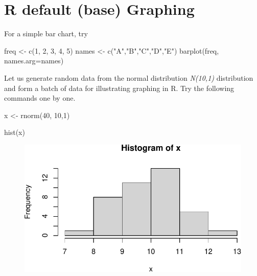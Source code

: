 \documentclass[
  letterpaper,
  DIV=11,
  numbers=noendperiod]{scrreprt}
\newenvironment{Shaded}{\begin{snugshade}}{\end{snugshade}}
\newcommand{\AttributeTok}[1]{\textcolor[rgb]{0.40,0.45,0.13}{#1}}
\newcommand{\DecValTok}[1]{\textcolor[rgb]{0.68,0.00,0.00}{#1}}
\newcommand{\FunctionTok}[1]{\textcolor[rgb]{0.28,0.35,0.67}{#1}}
\newcommand{\NormalTok}[1]{\textcolor[rgb]{0.00,0.23,0.31}{#1}}
\newcommand{\OtherTok}[1]{\textcolor[rgb]{0.00,0.23,0.31}{#1}}
\newcommand{\StringTok}[1]{\textcolor[rgb]{0.13,0.47,0.30}{#1}}
\begin{document}
\hypertarget{r-default-base-graphing}{%
\chapter*{R default (base) Graphing}\label{r-default-base-graphing}}

For a simple bar chart, try

\begin{Shaded}
\begin{Highlighting}[]
\NormalTok{freq }\OtherTok{\textless{}{-}} \FunctionTok{c}\NormalTok{(}\DecValTok{1}\NormalTok{, }\DecValTok{2}\NormalTok{, }\DecValTok{3}\NormalTok{, }\DecValTok{4}\NormalTok{, }\DecValTok{5}\NormalTok{)}
\NormalTok{names }\OtherTok{\textless{}{-}} \FunctionTok{c}\NormalTok{(}\StringTok{"A"}\NormalTok{,}\StringTok{"B"}\NormalTok{,}\StringTok{"C"}\NormalTok{,}\StringTok{"D"}\NormalTok{,}\StringTok{"E"}\NormalTok{)}
\FunctionTok{barplot}\NormalTok{(freq, }\AttributeTok{names.arg=}\NormalTok{names)}
\end{Highlighting}
\end{Shaded}

Let us generate random data from the normal distribution \emph{N(10,1)}
distribution and form a batch of data for illustrating graphing in R.
Try the following commands one by one.

\begin{Shaded}
\begin{Highlighting}[]
\NormalTok{x  }\OtherTok{\textless{}{-}}  \FunctionTok{rnorm}\NormalTok{(}\DecValTok{40}\NormalTok{, }\DecValTok{10}\NormalTok{,}\DecValTok{1}\NormalTok{)}

\FunctionTok{hist}\NormalTok{(x)}
\end{Highlighting}
\end{Shaded}

\begin{figure}[H]

{\centering \includegraphics{0-R-tidyverse_files/figure-pdf/unnamed-chunk-18-1.pdf}

}

\end{figure}
\end{document}
